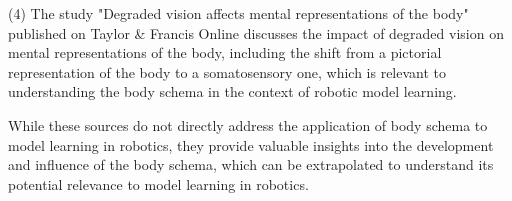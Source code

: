 (4) The study "Degraded vision affects mental representations of the body" published on Taylor \& Francis Online discusses the impact of degraded vision on mental representations of the body, including the shift from a pictorial representation of the body to a somatosensory one, which is relevant to understanding the body schema in the context of robotic model learning.

While these sources do not directly address the application of body schema to model learning in robotics, they provide valuable insights into the development and influence of the body schema, which can be extrapolated to understand its potential relevance to model learning in robotics.

